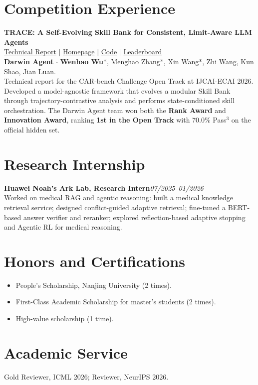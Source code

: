 \documentclass[a4paper,11pt]{article}
\newcommand{\entry}[2]{\textbf{#1}\hfill\textit{#2}\\}
\begin{document}
\section{Competition Experience}
\textbf{TRACE: A Self-Evolving Skill Bank for Consistent, Limit-Aware LLM Agents}\\
{\small \href{https://arxiv.org/abs/2608.22793}{Technical Report} \enspace|\enspace
\href{https://darwin-agent.github.io/Car-bench-TRACE/}{Homepage} \enspace|\enspace
\href{https://github.com/Darwin-Agent/Car-bench-TRACE}{Code} \enspace|\enspace
\href{https://car-bench.github.io/car-bench/leaderboard.html}{Leaderboard}}\\
{\small \textbf{Darwin Agent} $\cdot$ \textbf{Wenhao Wu}*, Menghao Zhang*, Xin Wang*, Zhi Wang, Kun Shao, Jian Luan.}\\
{\small Technical report for the CAR-bench Challenge Open Track at IJCAI-ECAI 2026. Developed a model-agnostic framework that evolves a modular Skill Bank through trajectory-contrastive analysis and performs state-conditioned skill orchestration. The Darwin Agent team won both the \textbf{Rank Award} and \textbf{Innovation Award}, ranking \textbf{1st in the Open Track} with 70.0\% Pass$^3$ on the official hidden set.}

\section{Research Internship}
\entry{Huawei Noah's Ark Lab, Research Intern}{07/2025--01/2026}
Worked on medical RAG and agentic reasoning: built a medical knowledge retrieval service; designed conflict-guided adaptive retrieval; fine-tuned a BERT-based answer verifier and reranker; explored reflection-based adaptive stopping and Agentic RL for medical reasoning.

\section{Honors and Certifications}
\begin{itemize}[leftmargin=1.4em,label=\textbullet,itemsep=2pt,topsep=2pt]
  \item People's Scholarship, Nanjing University (2 times).
  \item First-Class Academic Scholarship for master's students (2 times).
  \item High-value scholarship (1 time).
\end{itemize}

\section{Academic Service}
Gold Reviewer, ICML 2026; Reviewer, NeurIPS 2026.
\end{document}
